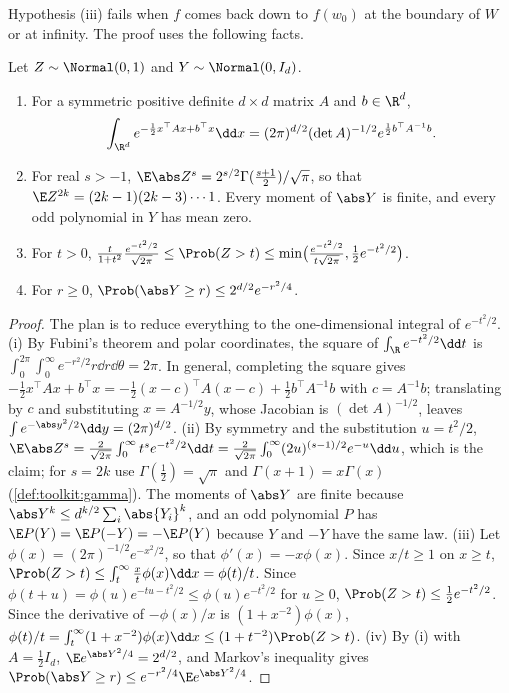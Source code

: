 \begin{refsection}
Hypothesis (iii) fails when $f$ comes back down to $f(w_0)$ at the boundary of $W$ or at infinity. The proof uses the following facts.

\begin{lemma}\label{lem:toolkit:gaussian}
Let $Z\sim\Normal(0,1)$ and $Y\sim\Normal(0,I_d)$.
\begin{enumerate}
\item For a symmetric positive definite $d\times d$ matrix $A$ and $b\in\R^d$,
\[
\int_{\R^d}e^{-\frac12x^\top Ax+b^\top x}\dd x=(2\pi)^{d/2}(\det A)^{-1/2}e^{\frac12b^\top A^{-1}b}.
\]
\item For real $s>-1$, $\E\abs Z^s=2^{s/2}\Gamma(\frac{s+1}2)/\sqrt\pi$, so that $\E Z^{2k}=(2k-1)(2k-3)\cdots1$. Every moment of $\abs Y$ is finite, and every odd polynomial in $Y$ has mean zero.
\item For $t>0$, $\frac t{1+t^2}\frac{e^{-t^2/2}}{\sqrt{2\pi}}\le\Prob(Z>t)\le\min\bigl(\frac{e^{-t^2/2}}{t\sqrt{2\pi}},\frac12e^{-t^2/2}\bigr)$.
\item For $r\ge0$, $\Prob(\abs Y\ge r)\le2^{d/2}e^{-r^2/4}$.
\end{enumerate}
\end{lemma}

\begin{proof}
The plan is to reduce everything to the one-dimensional integral of $e^{-t^2/2}$. (i) By Fubini's theorem and polar coordinates, the square of $\int_\R e^{-t^2/2}\dd t$ is $\int_0^{2\pi}\!\int_0^\infty e^{-r^2/2}r\dd r\dd\theta=2\pi$. In general, completing the square gives $-\frac12x^\top Ax+b^\top x=-\frac12(x-c)^\top A(x-c)+\frac12b^\top A^{-1}b$ with $c=A^{-1}b$; translating by $c$ and substituting $x=A^{-1/2}y$, whose Jacobian is $(\det A)^{-1/2}$, leaves $\int e^{-\abs y^2/2}\dd y=(2\pi)^{d/2}$.
(ii) By symmetry and the substitution $u=t^2/2$, $\E\abs Z^s=\frac2{\sqrt{2\pi}}\int_0^\infty t^se^{-t^2/2}\dd t=\frac2{\sqrt{2\pi}}\int_0^\infty(2u)^{(s-1)/2}e^{-u}\dd u$, which is the claim; for $s=2k$ use $\Gamma(\frac12)=\sqrt\pi$ and $\Gamma(x+1)=x\Gamma(x)$ (\cref{def:toolkit:gamma}). The moments of $\abs Y$ are finite because $\abs Y^k\le d^{k/2}\sum_i\abs{Y_i}^k$, and an odd polynomial $P$ has $\E P(Y)=\E P(-Y)=-\E P(Y)$ because $Y$ and $-Y$ have the same law.
(iii) Let $\phi(x)=(2\pi)^{-1/2}e^{-x^2/2}$, so that $\phi'(x)=-x\phi(x)$. Since $x/t\ge1$ on $x\ge t$, $\Prob(Z>t)\le\int_t^\infty\frac xt\phi(x)\dd x=\phi(t)/t$. Since $\phi(t+u)=\phi(u)e^{-tu-t^2/2}\le\phi(u)e^{-t^2/2}$ for $u\ge0$, $\Prob(Z>t)\le\frac12e^{-t^2/2}$. Since the derivative of $-\phi(x)/x$ is $(1+x^{-2})\phi(x)$, $\phi(t)/t=\int_t^\infty(1+x^{-2})\phi(x)\dd x\le(1+t^{-2})\Prob(Z>t)$.
(iv) By (i) with $A=\frac12I_d$, $\E e^{\abs Y^2/4}=2^{d/2}$, and Markov's inequality gives $\Prob(\abs Y\ge r)\le e^{-r^2/4}\E e^{\abs Y^2/4}$.
\end{proof}


\end{refsection}
